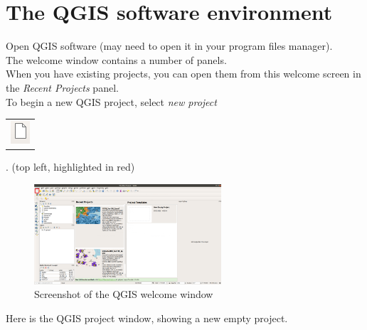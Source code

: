 \chapter{The QGIS software environment}

\pagestyle{fancy}
\fancyhf{}
\fancyhead[OC]{\leftmark}
\fancyhead[EC]{\rightmark}
\cfoot{\thepage}



Open QGIS software (may need to open it in your program files manager).\\
The welcome window contains a number of panels.\\
When you have existing projects, you can open them from this welcome screen in the \emph{Recent Projects} panel.\\
To begin a new QGIS project, select \emph{new project} \begin{tabular}{@{}c@{}}\includegraphics[width=3ex]{images/new_project_icon.png}\end{tabular}. (top left, highlighted in red) \\

\begin{figure}[!h]
	\centering
	\includegraphics[width=0.62\textwidth]{images/open_qgis_screenshot_new_project.png}
	\caption{Screenshot of the QGIS welcome window}
	\label{ft_fig_firstfig3}
\end{figure}

Here is the QGIS project window, showing a new empty project.


